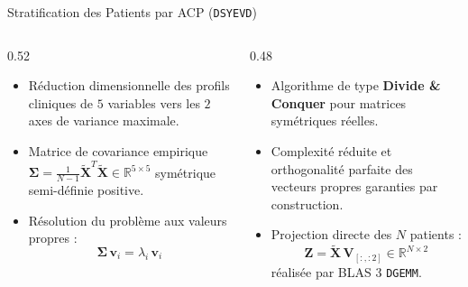 \documentclass[aspectratio=169, 10pt, french]{beamer}
\begin{document}
\begin{frame}{Stratification des Patients par ACP (\texttt{DSYEVD})}
    \begin{columns}[c]
        \begin{column}{0.52\textwidth}
            \begin{cadreconcept}
                \small
                \begin{itemize}
                    \item Réduction dimensionnelle des profils cliniques de $5$ variables vers les $2$ axes de variance maximale.
                    \item Matrice de covariance empirique $\mathbf{\Sigma} = \frac{1}{N-1}\mathbf{\tilde{X}}^T\mathbf{\tilde{X}} \in \mathbb{R}^{5 \times 5}$ symétrique semi-définie positive.
                    \item Résolution du problème aux valeurs propres :
                    $$\mathbf{\Sigma}\,\mathbf{v}_i = \lambda_i\,\mathbf{v}_i$$
                \end{itemize}
            \end{cadreconcept}
        \end{column}

        \begin{column}{0.48\textwidth}
            \begin{cadrehpc}
                \small
                \begin{itemize}
                    \item Algorithme de type \textbf{Divide \& Conquer} pour matrices symétriques réelles.
                    \item Complexité réduite et orthogonalité parfaite des vecteurs propres garanties par construction.
                    \item Projection directe des $N$ patients :
                    $$\mathbf{Z} = \mathbf{\tilde{X}}\,\mathbf{V}_{[:, :2]} \in \mathbb{R}^{N \times 2}$$
                    réalisée par BLAS 3 \texttt{DGEMM}.
                \end{itemize}
            \end{cadrehpc}
        \end{column}
    \end{columns}
\end{frame}
\end{document}
